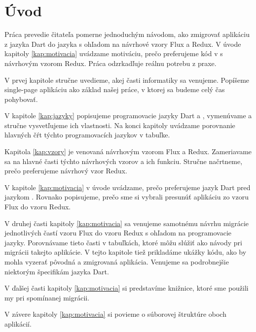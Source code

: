 \chapter*{Úvod} %

Práca prevedie čitateľa pomerne jednoduchým návodom, ako zmigrovať aplikáciu z jazyka Dart do jazyka \JS{} s ohľadom na návrhové vzory Flux a Redux. V úvode kapitoly \ref{kap:motivacia} uvádzame motiváciu, prečo preferujeme kód v \JS{} s návrhovým vzorom Redux. Práca odzrkadľuje reálnu potrebu z praxe.

V prvej kapitole stručne uvedieme, akej časti informatiky sa venujeme. Popíšeme single-page aplikáciu ako základ našej práce, v ktorej sa budeme celý čas pohybovať.

V kapitole \ref{kap:jazyky} popisujeme programovacie jazyky Dart a \JS{}, vymenúvame a stručne vysvetľujeme ich vlastnosti. Na konci kapitoly uvádzame porovnanie hlavných čŕt týchto programovacích jazykov v tabuľke.

Kapitola \ref{kap:vzory} je venovaná návrhovým vzorom Flux a Redux. Zameriavame sa na hlavné časti týchto návrhových vzorov a ich funkciu. Stručne načrtneme, prečo preferujeme návrhový vzor Redux.

V kapitole \ref{kap:motivacia} v úvode uvádzame, prečo preferujeme jazyk Dart pred jazykom \JS{}. Rovnako popisujeme, prečo sme si vybrali presunúť aplikáciu zo vzoru Flux do vzoru Redux.

V druhej časti kapitoly \ref{kap:motivacia} sa venujeme samotnému návrhu migrácie jednotlivých častí vzoru Flux do vzoru Redux s ohľadom na programovacie jazyky. Porovnávame tieto časti v tabuľkách, ktoré môžu slúžiť ako návody pri migrácii takejto aplikácie. V tejto kapitole tiež prikladáme ukážky kódu, ako by mohla vyzerať pôvodná a zmigrovaná aplikácia. Venujeme sa podrobnejšie niektorým špecifikám jazyka Dart.

V ďalšej časti kapitoly \ref{kap:motivacia} si predstavíme knižnice, ktoré sme použili my pri spomínanej migrácii.

V závere kapitoly \ref{kap:motivacia} si povieme o súborovej štruktúre oboch aplikácií.
